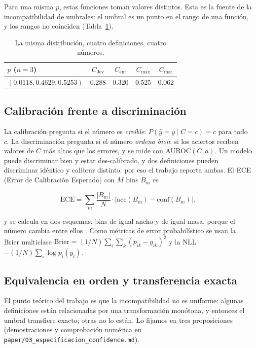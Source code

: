 Para una misma $p$, estas funciones toman valores distintos. Esta es la fuente de la incompatibilidad de
umbrales: el umbral es un punto en el rango de una función, y los rangos no coinciden (Tabla~\ref{tab:cuatro_numeros}).

\begin{table}[t]
\centering
\caption{La misma distribución, cuatro definiciones, cuatro números.}
\label{tab:cuatro_numeros}
\small
\begin{tabular}{lcccc}
\toprule
$p$ ($n = 3$) & $C_{\mathrm{Jev}}$ & $C_{\mathrm{ent}}$ & $C_{\max}$ & $C_{\mathrm{mar}}$ \\
\midrule
$(0.0118, 0.4629, 0.5253)$ & 0.288 & 0.320 & 0.525 & 0.062 \\
\bottomrule
\end{tabular}
\end{table}

\subsection{Calibración frente a discriminación}

La calibración pregunta si el número es \emph{creíble}: $P(\hat{y} = y \mid C = c) = c$ para todo
$c$. La discriminación pregunta si el número \emph{ordena bien}: si los aciertos reciben valores de
$C$ más altos que los errores, y se mide con AUROC$(C, a)$. Un modelo puede discriminar bien y estar
des-calibrado, y dos definiciones pueden discriminar idéntico y calibrar distinto: por eso el trabajo
reporta ambas. El ECE (Error de Calibración Esperado) con $M$ bins $B_m$ es

\[
\mathrm{ECE} = \sum_m \frac{\lvert B_m\rvert}{N}\cdot \lvert \mathrm{acc}(B_m) - \mathrm{conf}(B_m)\rvert,
\]

y se calcula en dos esquemas, bins de igual ancho y de igual masa, porque el número
cambia entre ellos \cite{naeini2015,guo2017}. Como métricas de error probabilístico se usan la
Brier multiclase $\mathrm{Brier} = (1/N)\sum_i \sum_k (p_{ik} - y_{ik})^2$ \cite{brier1950} y la
NLL $-(1/N)\sum_i \log p_i(y_i)$.

\subsection{Equivalencia en orden y transferencia exacta}

El punto teórico del trabajo es que la incompatibilidad no es uniforme: algunas definiciones están
relacionadas por una transformación monótona, y entonces el umbral transfiere exacto; otras no lo
están. Lo fijamos en tres proposiciones (demostraciones y comprobación numérica en
\texttt{paper/03\_especificacion\_confidence.md}).

